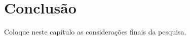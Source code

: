 \chapter{Conclusão}\label{chp:24_conclusao}

\begin{resumocapitulo}
Coloque neste capítulo as considerações finais da pesquisa.
\end{resumocapitulo}